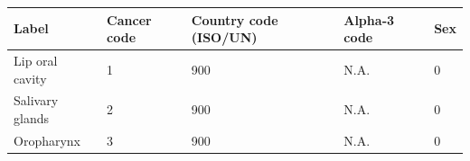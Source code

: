 \begin{tabular}{p{2cm}p{1.5cm}p{2.5cm}p{1.5cm}p{1.2cm}}
\toprule
Label & Cancer code & Country code (ISO/UN) & Alpha‑3 code & Sex \\
\midrule
Lip oral cavity & 1 & 900 & N.A. & 0 \\
Salivary glands & 2 & 900 & N.A. & 0 \\
Oropharynx & 3 & 900 & N.A. & 0 \\
\bottomrule
\end{tabular} 